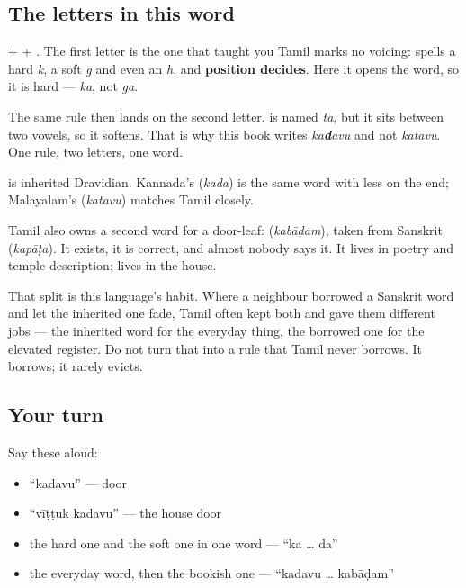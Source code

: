 \subsection*{The letters in this word}
\textbf{} + \textbf{} + \textbf{}. The first letter is the one that taught you Tamil marks no voicing: \textbf{} spells a hard \emph{k}, a soft \emph{g} and even an \emph{h}, and \textbf{position decides}. Here it opens the word, so it is hard — \emph{ka}, not \emph{ga}.

The same rule then lands on the second letter. \textbf{} is named \emph{ta}, but it sits between two vowels, so it softens. That is why this book writes \emph{ka\textbf{d}avu} and not \emph{katavu}. One rule, two letters, one word.

\begin{cousinweb}
\textbf{} is inherited Dravidian. Kannada's \textbf{} (\emph{kada}) is the same word with less on the end; Malayalam's \textbf{} (\emph{katavu}) matches Tamil closely.

Tamil also owns a second word for a door-leaf: \textbf{} (\emph{kabāḍam}), taken from Sanskrit \textbf{} (\emph{kapāṭa}). It exists, it is correct, and almost nobody says it. It lives in poetry and temple description; \textbf{} lives in the house.

That split is this language's habit. Where a neighbour borrowed a Sanskrit word and let the inherited one fade, Tamil often kept both and gave them different jobs — the inherited word for the everyday thing, the borrowed one for the elevated register. Do not turn that into a rule that Tamil never borrows. It borrows; it rarely evicts.
\end{cousinweb}

\subsection*{Your turn}
Say these aloud:

\begin{itemize}
\raggedright
  \item \textquotedblleft{}kadavu\textquotedblright{} — door
  \item \textquotedblleft{}vīṭṭuk kadavu\textquotedblright{} — the house door
  \item the hard one and the soft one in one word — \textquotedblleft{}ka … da\textquotedblright{}
  \item the everyday word, then the bookish one — \textquotedblleft{}kadavu … kabāḍam\textquotedblright{}
\end{itemize}

